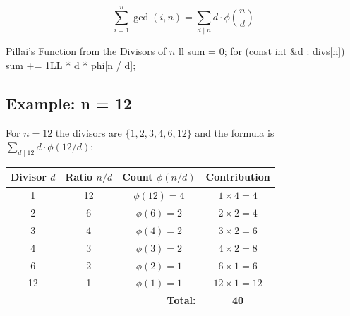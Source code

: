 \documentclass[11pt]{article}
\begin{document}
\begin{resultbox}
    \begin{equation}
        \sum_{i=1}^n \gcd(i, n) = \sum_{d \mid n} d \cdot \phi\left(\frac{n}{d}\right) \label{eq:pillai_result}
    \end{equation}
\end{resultbox}

\begin{vscode}{Pillai's Function from the Divisors of $n$}
ll sum = 0;
for (const int &d : divs[n])
    sum += 1LL * d * phi[n / d];
\end{vscode}

\subsection{Example: n = 12}
For $n=12$ the divisors are $\{1, 2, 3, 4, 6, 12\}$ and the formula is $\sum_{d\mid 12} d \cdot \phi(12/d)$:

\begin{center}
    \begin{tabular}{c c c c}
        \toprule
        \textbf{Divisor} $d$                & \textbf{Ratio} $n/d$ & \textbf{Count} $\phi(n/d)$ & \textbf{Contribution} \\
        \midrule
        1                                   & 12                   & $\phi(12)=4$               & $1 \times 4 = 4$      \\
        2                                   & 6                    & $\phi(6)=2$                & $2 \times 2 = 4$      \\
        3                                   & 4                    & $\phi(4)=2$                & $3 \times 2 = 6$      \\
        4                                   & 3                    & $\phi(3)=2$                & $4 \times 2 = 8$      \\
        6                                   & 2                    & $\phi(2)=1$                & $6 \times 1 = 6$      \\
        12                                  & 1                    & $\phi(1)=1$                & $12 \times 1 = 12$    \\
        \midrule
        \multicolumn{3}{r}{\textbf{Total:}} & \textbf{40}                                                               \\
        \bottomrule
    \end{tabular}
\end{center}
\end{document}
